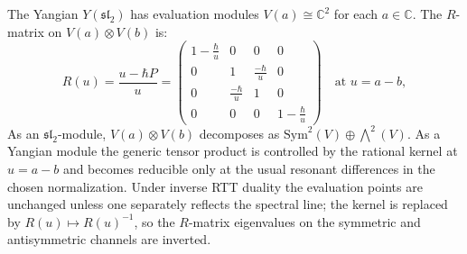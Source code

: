 \begin{example}
\label{ex:yangian-sl2-modules}
The Yangian $Y(\mathfrak{sl}_2)$ has evaluation modules
$V(a) \cong \mathbb{C}^2$ for each $a \in \mathbb{C}$. The
$R$-matrix on $V(a) \otimes V(b)$ is:
\[
R(u) = \frac{u - \hbar P}{u}
= \begin{pmatrix}
1 - \frac{\hbar}{u} & 0 & 0 & 0 \\
0 & 1 & \frac{-\hbar}{u} & 0 \\
0 & \frac{-\hbar}{u} & 1 & 0 \\
0 & 0 & 0 & 1 - \frac{\hbar}{u}
\end{pmatrix}
\quad\text{at } u = a-b,
\]
As an $\mathfrak{sl}_2$-module,
$V(a)\otimes V(b)$ decomposes as
$\mathrm{Sym}^2(V)\oplus\bigwedge^2(V)$.  As a Yangian module the
generic tensor product is controlled by the rational kernel at
$u=a-b$ and becomes reducible only at the usual resonant differences
in the chosen normalization.  Under inverse RTT duality the
evaluation points are unchanged unless one separately reflects the
spectral line; the kernel is replaced by
$R(u)\mapsto R(u)^{-1}$, so the $R$-matrix eigenvalues on the
symmetric and antisymmetric channels are inverted.
\end{example}

